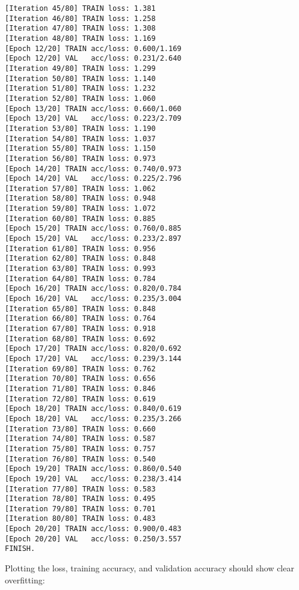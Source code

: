 \documentclass[11pt]{article}
\begin{document}
\begin{Verbatim}[commandchars=\\\{\}]
[Iteration 45/80] TRAIN loss: 1.381
[Iteration 46/80] TRAIN loss: 1.258
[Iteration 47/80] TRAIN loss: 1.308
[Iteration 48/80] TRAIN loss: 1.169
[Epoch 12/20] TRAIN acc/loss: 0.600/1.169
[Epoch 12/20] VAL   acc/loss: 0.231/2.640
[Iteration 49/80] TRAIN loss: 1.299
[Iteration 50/80] TRAIN loss: 1.140
[Iteration 51/80] TRAIN loss: 1.232
[Iteration 52/80] TRAIN loss: 1.060
[Epoch 13/20] TRAIN acc/loss: 0.660/1.060
[Epoch 13/20] VAL   acc/loss: 0.223/2.709
[Iteration 53/80] TRAIN loss: 1.190
[Iteration 54/80] TRAIN loss: 1.037
[Iteration 55/80] TRAIN loss: 1.150
[Iteration 56/80] TRAIN loss: 0.973
[Epoch 14/20] TRAIN acc/loss: 0.740/0.973
[Epoch 14/20] VAL   acc/loss: 0.225/2.796
[Iteration 57/80] TRAIN loss: 1.062
[Iteration 58/80] TRAIN loss: 0.948
[Iteration 59/80] TRAIN loss: 1.072
[Iteration 60/80] TRAIN loss: 0.885
[Epoch 15/20] TRAIN acc/loss: 0.760/0.885
[Epoch 15/20] VAL   acc/loss: 0.233/2.897
[Iteration 61/80] TRAIN loss: 0.956
[Iteration 62/80] TRAIN loss: 0.848
[Iteration 63/80] TRAIN loss: 0.993
[Iteration 64/80] TRAIN loss: 0.784
[Epoch 16/20] TRAIN acc/loss: 0.820/0.784
[Epoch 16/20] VAL   acc/loss: 0.235/3.004
[Iteration 65/80] TRAIN loss: 0.848
[Iteration 66/80] TRAIN loss: 0.764
[Iteration 67/80] TRAIN loss: 0.918
[Iteration 68/80] TRAIN loss: 0.692
[Epoch 17/20] TRAIN acc/loss: 0.820/0.692
[Epoch 17/20] VAL   acc/loss: 0.239/3.144
[Iteration 69/80] TRAIN loss: 0.762
[Iteration 70/80] TRAIN loss: 0.656
[Iteration 71/80] TRAIN loss: 0.846
[Iteration 72/80] TRAIN loss: 0.619
[Epoch 18/20] TRAIN acc/loss: 0.840/0.619
[Epoch 18/20] VAL   acc/loss: 0.235/3.266
[Iteration 73/80] TRAIN loss: 0.660
[Iteration 74/80] TRAIN loss: 0.587
[Iteration 75/80] TRAIN loss: 0.757
[Iteration 76/80] TRAIN loss: 0.540
[Epoch 19/20] TRAIN acc/loss: 0.860/0.540
[Epoch 19/20] VAL   acc/loss: 0.238/3.414
[Iteration 77/80] TRAIN loss: 0.583
[Iteration 78/80] TRAIN loss: 0.495
[Iteration 79/80] TRAIN loss: 0.701
[Iteration 80/80] TRAIN loss: 0.483
[Epoch 20/20] TRAIN acc/loss: 0.900/0.483
[Epoch 20/20] VAL   acc/loss: 0.250/3.557
FINISH.

    \end{Verbatim}

    Plotting the loss, training accuracy, and validation accuracy should
show clear overfitting:
\end{document}
